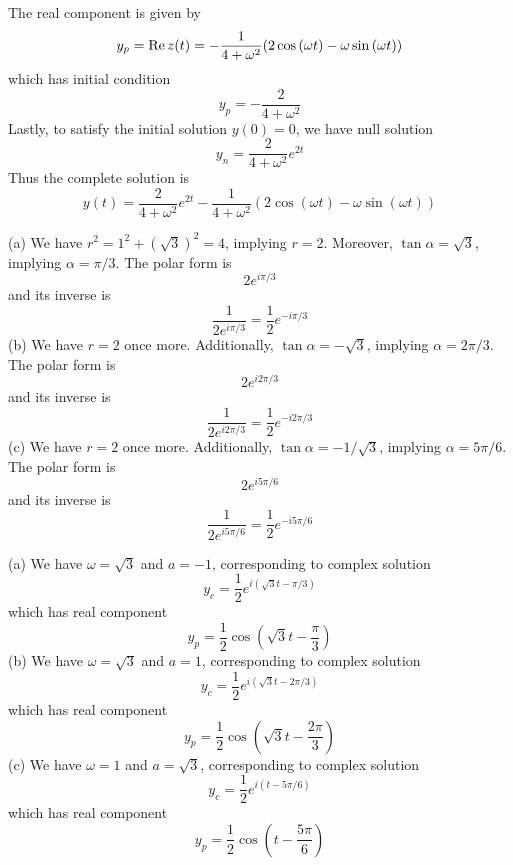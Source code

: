 \documentclass[a4paper]{article}
\begin{document}
The real component is given by
\[
	y_{p} = \operatorname{Re} z \!\left( t \right) = -\frac{1}{4 + \omega^{2}} \!\left( 2 \cos\left( \omega t \right) - \omega \sin\left( \omega t \right) \right) 
\]
which has initial condition
\[
	y_{p} = - \frac{2}{4 + \omega^{2}}
\]
Lastly, to satisfy the initial solution \(y \!\left( 0 \right) = 0\), we have null solution
\[
	y_{n} = \frac{2}{4 + \omega^{2}} e^{2t}
\]
Thus the complete solution is
\[
	y \!\left( t \right) = \frac{2}{4 + \omega^{2}}e^{2t} - \frac{1}{4 + \omega^{2}} \!\left( 2 \cos\left( \omega t \right) - \omega \sin\left( \omega t \right) \right) 
\]


(a) We have \(r^{2} = 1^{2} + \!\left( \sqrt{3} \right)^{2} = 4 \), implying \(r = 2\). Moreover, \(\tan \alpha = \sqrt{3}\), implying \(\alpha = \pi / 3\). The polar form is
\[
	2e^{i \pi / 3}
\]
and its inverse is
\[
	\frac{1}{2e^{i \pi / 3}} = \frac{1}{2} e^{-i \pi /3}
\]
(b) We have \(r = 2\) once more. Additionally, \(\tan \alpha = -\sqrt{3}\), implying \(\alpha = 2 \pi / 3\). The polar form is
\[
	2e^{i 2 \pi / 3}
\]
and its inverse is
\[
        \frac{1}{2 e^{i 2\pi /3}} = \frac{1}{2} e^{- i 2\pi / 3}
\]
(c) We have \(r = 2\) once more. Additionally, \(\tan \alpha = -1 / \sqrt{3}\), implying \(\alpha = 5 \pi / 6\). The polar form is
\[
	2e^{i 5 \pi / 6} 
\]
and its inverse is
\[
	\frac{1}{2e^{i 5 \pi / 6}} = \frac{1}{2} e^{-i 5 \pi / 6}
\]


(a) We have \(\omega = \sqrt{3}\) and \(a = -1\), corresponding to complex solution
\[
	y_{c} = \frac{1}{2} e^{i \!\left( \sqrt{3} t - \pi / 3 \right) }
\]
which has real component
\[
	y_{p} = \frac{1}{2} \cos\left( \sqrt{3}t - \frac{\pi }{3}\right)
\]
(b) We have \(\omega = \sqrt{3}\) and \(a = 1\), corresponding to complex solution
\[
	y_{c} = \frac{1}{2} e^{i \!\left( \sqrt{3}t - 2 \pi / 3 \right) }
\]
which has real component
\[
	y_{p} = \frac{1}{2} \cos\left( \sqrt{3}t - \frac{2 \pi }{3} \right)
\]
(c) We have \(\omega = 1\) and \(a = \sqrt{3}\), corresponding to complex solution
\[
	y_{c} = \frac{1}{2} e^{i \!\left( t - 5 \pi / 6 \right) }
\]
which has real component
\[
	y_{p} = \frac{1}{2} \cos\left( t - \frac{5 \pi }{6} \right)
\]
\end{document}
